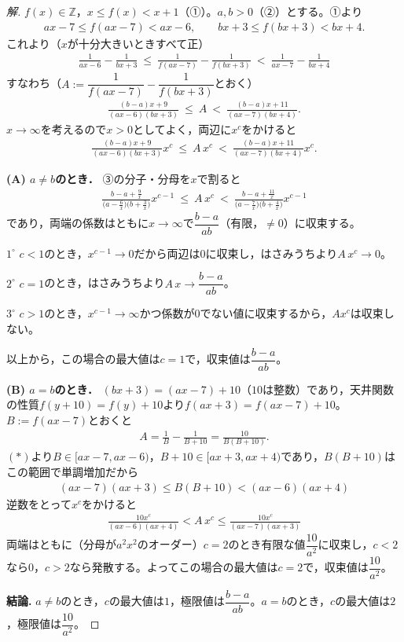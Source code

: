 \documentclass[../main.tex]{subfiles}
\begin{document}
\begin{proof}[解]
  $f(x)\in\mathbb Z$，$x\le f(x)<x+1$（①）。$a,b>0$（②）とする。①より
  \begin{align*}
    ax-7\le f(ax-7)<ax-6,\qquad bx+3\le f(bx+3)<bx+4.\tag{$\ast$}
  \end{align*}
  これより（$x$が十分大きいときすべて正）
  \begin{align*}
    \frac1{ax-6}-\frac1{bx+3}\ \le\ \frac1{f(ax-7)}-\frac1{f(bx+3)}\ <\ \frac1{ax-7}-\frac1{bx+4}
  \end{align*}
  すなわち（$A:=\dfrac1{f(ax-7)}-\dfrac1{f(bx+3)}$とおく）
  \begin{align*}
    \frac{(b-a)x+9}{(ax-6)(bx+3)}\ \le\ A\ <\ \frac{(b-a)x+11}{(ax-7)(bx+4)}.
  \end{align*}
  $x\to\infty$を考えるので$x>0$としてよく，両辺に$x^c$をかけると
  \begin{align*}
    \frac{(b-a)x+9}{(ax-6)(bx+3)}x^c\ \le\ A\,x^c\ <\ \frac{(b-a)x+11}{(ax-7)(bx+4)}x^c.\tag{③}
  \end{align*}

  \textbf{(A) $a\neq b$のとき．} ③の分子・分母を$x$で割ると
  \begin{align*}
    \frac{b-a+\frac9x}{\bigl(a-\frac6x\bigr)\bigl(b+\frac3x\bigr)}x^{c-1}\ \le\ A\,x^c\ <\ \frac{b-a+\frac{11}x}{\bigl(a-\frac7x\bigr)\bigl(b+\frac4x\bigr)}x^{c-1}
  \end{align*}
  であり，両端の係数はともに$x\to\infty$で$\dfrac{b-a}{ab}$（有限，$\neq0$）に収束する。

  $1^\circ$ $c<1$のとき，$x^{c-1}\to0$だから両辺は$0$に収束し，はさみうちより$A\,x^c\to0$。

  $2^\circ$ $c=1$のとき，はさみうちより$A\,x\to\dfrac{b-a}{ab}$。

  $3^\circ$ $c>1$のとき，$x^{c-1}\to\infty$かつ係数が$0$でない値に収束するから，$Ax^c$は収束しない。

  以上から，この場合の最大値は$c=1$で，収束値は$\dfrac{b-a}{ab}$。

  \textbf{(B) $a=b$のとき．} $(bx+3)=(ax-7)+10$（$10$は整数）であり，天井関数の性質$f(y+10)=f(y)+10$より$f(ax+3)=f(ax-7)+10$。$B:=f(ax-7)$とおくと
  \begin{align*}
    A=\frac1B-\frac1{B+10}=\frac{10}{B(B+10)}.
  \end{align*}
  $(\ast)$より$B\in[ax-7,ax-6)$，$B+10\in[ax+3,ax+4)$であり，$B(B+10)$はこの範囲で単調増加だから
  \begin{align*}
    (ax-7)(ax+3)\le B(B+10)<(ax-6)(ax+4)
  \end{align*}
  逆数をとって$x^c$をかけると
  \begin{align*}
    \frac{10x^c}{(ax-6)(ax+4)}<A\,x^c\le\frac{10x^c}{(ax-7)(ax+3)}
  \end{align*}
  両端はともに（分母が$a^2x^2$のオーダー）$c=2$のとき有限な値$\dfrac{10}{a^2}$に収束し，$c<2$なら$0$，$c>2$なら発散する。よってこの場合の最大値は$c=2$で，収束値は$\dfrac{10}{a^2}$。

  \textbf{結論.} $a\neq b$のとき，$c$の最大値は$1$，極限値は$\dfrac{b-a}{ab}$。$a=b$のとき，$c$の最大値は$2$，極限値は$\dfrac{10}{a^2}$。
\end{proof}
\end{document}
